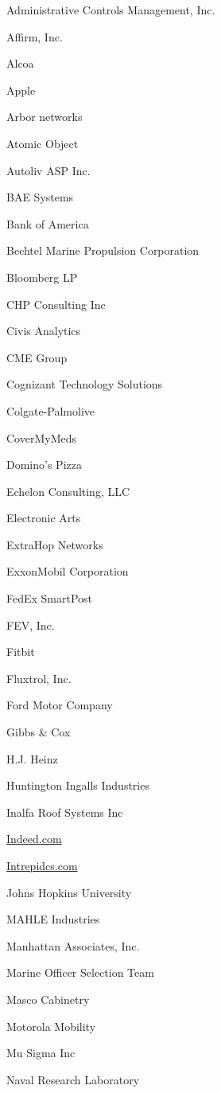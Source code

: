 \documentclass[twoside]{article}
\begin{document}
\begin{center}
\begin{multicols}{5}
\begin{FlushLeft}
\begin{compactitem}
\item Administrative Controls Management, Inc.
\item Affirm, Inc.
\item Alcoa
\item Apple
\item Arbor networks
\item Atomic Object
\item Autoliv ASP Inc.
\item BAE Systems
\item Bank of America
\item Bechtel Marine Propulsion Corporation
\item Bloomberg LP
\item CHP Consulting Inc
\item Civis Analytics
\item CME Group
\item Cognizant Technology Solutions
\item Colgate-Palmolive
\item CoverMyMeds
\item Domino's Pizza
\item Echelon Consulting, LLC
\item Electronic Arts
\item ExtraHop Networks
\item ExxonMobil Corporation
\item FedEx SmartPost
\item FEV, Inc.
\item Fitbit
\item Fluxtrol, Inc.
\item Ford Motor Company
\item Gibbs \& Cox
\item H.J. Heinz
\item Huntington Ingalls Industries
\item Inalfa Roof Systems Inc
\item \url{Indeed.com}
\item \url{Intrepidcs.com}
\item Johns Hopkins University
\item MAHLE Industries
\item Manhattan Associates, Inc.
\item Marine Officer Selection Team
\item Masco Cabinetry
\item Motorola Mobility
\item Mu Sigma Inc
\item Naval Research Laboratory

\end{compactitem}
\end{FlushLeft}
\end{multicols}
\end{center}
\end{document}
